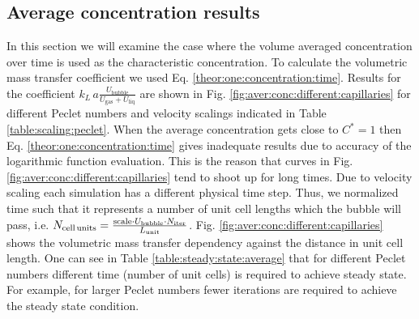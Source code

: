 \documentclass[preprint,12pt]{elsarticle}
\newcommand{\beqal}{\begin{equation}\begin{aligned}}
\newcommand{\feqal}{\end{aligned}\end{equation}}
\newcommand{\vol}{k_L\,a}
\newcommand{\lunit}{L_{\mathrm{unit}}}
\newcommand{\ububble}{U_{\mathrm{bubble}}}
\newcommand{\uliq}{U_{\mathrm{liq}}}
\newcommand{\ugas}{U_{\mathrm{gas}}}
\newcommand{\cstar}{C^{*}}
\begin{document}
\subsection{Average concentration results}
\label{main:results:periodic}
In this section we will examine the case where the volume averaged concentration over
 time is used as the characteristic concentration. To calculate the volumetric mass transfer coefficient we used Eq. \ref{theor:one:concentration:time}.
Results for the coefficient $\vol \frac{\ububble}{\ugas+\uliq}$ are shown in Fig.
\ref{fig:aver:conc:different:capillaries} for different Peclet numbers and velocity scalings
indicated in Table \ref{table:scaling:peclet}. When the average concentration gets
close to $\cstar=1$ then Eq. \ref{theor:one:concentration:time} gives inadequate results due to
 accuracy of the logarithmic function evaluation. This is the reason that curves in Fig. \ref{fig:aver:conc:different:capillaries}
 tend to shoot up for long times.
Due to velocity scaling
each simulation has a different physical time step. Thus, we normalized time such that it represents a number of unit cell lengths which the bubble will pass, i.e. 
$N_{\text{cell\,units}}=\frac{\text{scale}\cdot \ububble\cdot N_{\mathrm{iter}}}{\lunit}$.  Fig.
\ref{fig:aver:conc:different:capillaries} shows the volumetric mass transfer
dependency against the distance in unit cell length. One can see in Table
\ref{table:steady:state:average} that for different Peclet numbers different time (number of unit
cells) is required to achieve  steady state. For example, for
larger Peclet numbers fewer iterations are required to achieve the steady state condition. 
\end{document}
